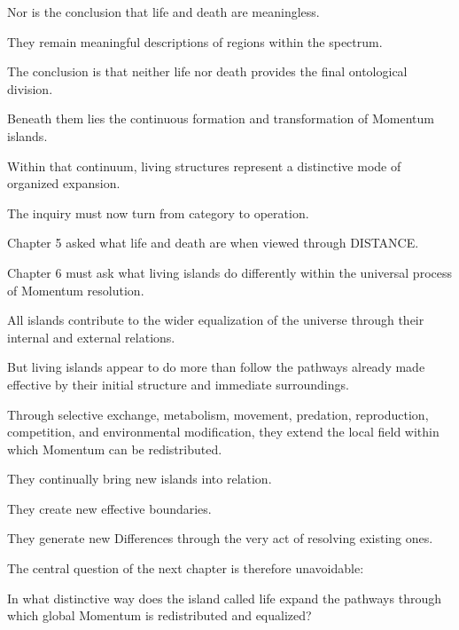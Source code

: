 Nor is the conclusion that life and death are meaningless.

They remain meaningful descriptions of regions within the spectrum.

The conclusion is that neither life nor death provides the final ontological division.

Beneath them lies the continuous formation and transformation of Momentum islands.

Within that continuum, living structures represent a distinctive mode of organized expansion.

The inquiry must now turn from category to operation.

Chapter 5 asked what life and death are when viewed through DISTANCE.

Chapter 6 must ask what living islands do differently within the universal process of Momentum resolution.

All islands contribute to the wider equalization of the universe through their internal and external relations.

But living islands appear to do more than follow the pathways already made effective by their initial structure and immediate surroundings.

Through selective exchange, metabolism, movement, predation, reproduction, competition, and environmental modification, they extend the local field within which Momentum can be redistributed.

They continually bring new islands into relation.

They create new effective boundaries.

They generate new Differences through the very act of resolving existing ones.

The central question of the next chapter is therefore unavoidable:

In what distinctive way does the island called life expand the pathways through which global Momentum is redistributed and equalized?

